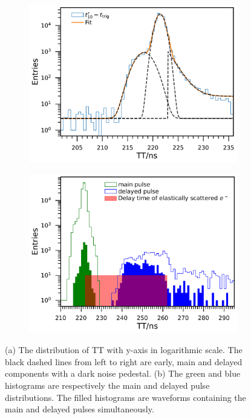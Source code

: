 \begin{figure}[!htbp]
    \centering
    \begin{subfigure}[t]{\SF\textwidth}
        \includegraphics[width=\textwidth]{figures/method/triggerTTSLog.pdf}
        \caption{}%
        \label{fig:triggerTTSLog}
    \end{subfigure}
    \begin{subfigure}[t]{\SF\textwidth}
        \includegraphics[width=\textwidth]{figures/method/triggerDelayedPulse.pdf}
        \caption{}%
        \label{fig:triggerTTlatepulse}
    \end{subfigure}
    \caption{(a) The distribution of TT with y-axis in logarithmic scale. The black dashed lines from left to right are early, main and delayed components with a dark noise pedestal. (b) The green and blue histograms are respectively the main and delayed pulse distributions. The filled histograms are waveforms containing the main and delayed pulses simultaneously.}
\end{figure}

